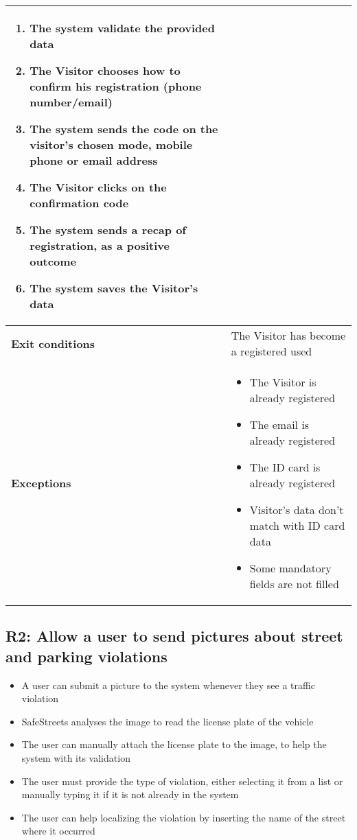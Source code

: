 \begin{description}
\begin{center}
\begin{tabular}{|p{3cm}|p{7cm}|}
\begin{enumerate}
                \item The system validate the provided data 
                \item The Visitor chooses how to confirm his registration (phone number/email) 
                \item The system sends the code on the visitor's chosen mode, mobile phone or email address
                \item The Visitor clicks on the confirmation code
                \item The system sends a recap of registration, as a positive outcome 
                \item The system saves the Visitor's data
            \end{enumerate} \\
            \hline
            \textbf{Exit conditions} & The Visitor has become a registered used \\
            \hline
            \textbf{Exceptions}
            & \begin{itemize}
                \item The Visitor is already registered
                \item The email is already registered
                \item The ID card is already registered 
                \item Visitor's data don't match with ID card data
                \item Some mandatory fields are not filled 
            \end{itemize} \\
            \hline
        \end{tabular}
    \end{center}
\end{description}

\subsection{R2: Allow a user to send pictures about street and parking violations}
\begin{itemize}
    \item A user can submit a picture to the system whenever they see a traffic violation
    \item SafeStreets analyses the image to read the license plate of the vehicle
    \item The user can manually attach the license plate to the image, to help the system with its validation
    \item The user must provide the type of violation, either selecting it from a list or manually typing it if it is not already in the system
    \item The user can help localizing the violation by inserting the name of the street where it occurred
\end{itemize}

